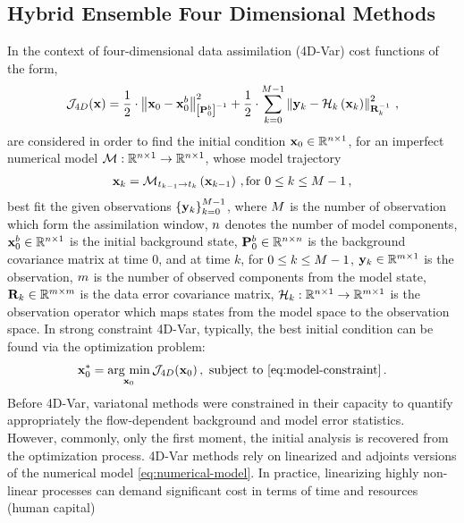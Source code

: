 \subsection{Hybrid Ensemble Four Dimensional Methods}
\label{subsec:hybrid-methods}
In the context of four-dimensional data assimilation (4D-Var) cost functions of the form,
\begin{eqnarray}
\label{eq:4D-Var-cost-function}
\displaystyle
\mathcal{J}_{4D}({\bf x}) = \frac{1}{2} \cdot \left \| {\bf x}_0-{\bf x}_0^b \right \|_{\left [ {\bf P}^b_{0} \right ]^{-1}}^2 + \frac{1}{2} \cdot \sum_{k=0}^{M-1} \left \| {\bf y}_k-\mathcal{H}_k \left ( {\bf x}_k \right ) \right \|^2_{{\bf R}_k^{-1}} \,,
\end{eqnarray}
%
are considered in order to find the initial condition ${\bf x}_0 \in \mathbb{R}^{n \times 1}$, for an imperfect numerical model $\mathcal{M}:\mathbb{R}^{n \times 1} \rightarrow \mathbb{R}^{n \times 1}$, whose model trajectory
\begin{eqnarray}
\label{eq:model-constraint}
\displaystyle
{\bf x}_{k} = \mathcal{M}_{t_{k-1} \rightarrow t_k} \left ( {\bf x}_{k-1}\right )  \,, \text{for $0 \le k \le M-1$}\,,
\end{eqnarray}
best fit the given observations $\left \{ {\bf y}_k \right \}_{k=0}^{M-1}$, where $M$ is the number of observation which form the assimilation window, $n$ denotes the number of model components, ${\bf x}_0^b \in \mathbb{R}^{n \times 1}$ is the initial background state, ${\bf P}^b_0 \in \mathbb{R}^{n \times n}$ is the background covariance matrix at time 0, and at time $k$, for $0 \le k \le M-1$, ${\bf y}_k \in \mathbb{R}^{m \times 1}$ is the observation, $m$ is the number of observed components from the model state, ${\bf R}_k \in \mathbb{R}^{m \times m}$ is the data error covariance matrix, $\mathcal{H}_k:\mathbb{R}^{n \times 1} \rightarrow \mathbb{R}^{m \times 1}$ is the observation operator which maps states from the model space to the observation space. In strong constraint 4D-Var, typically, the best initial condition can be found via the optimization problem:
\begin{eqnarray}
\label{eq:4D-constraint-optimization-problem}
\displaystyle
{\bf x}_0^{*} = \underset{{\bf x}_0}{\arg\,\min} \, \mathcal{J}_{4D}({\bf x}_0) \,,\text{ subject to \eqref{eq:model-constraint}} \,.
\end{eqnarray}
%
Before 4D-Var, variatonal methods were constrained in their capacity to quantify appropriately the flow-dependent background and model error statistics. However, commonly, only the first moment, the initial analysis is recovered from the optimization process. 4D-Var methods rely on linearized and adjoints versions of the numerical model \eqref{eq:numerical-model}. In practice, linearizing highly non-linear processes can demand significant cost in terms of time and resources (human capital) \cite{yang1996statistical,stiller2009efficient,stiller2009efficient2,ruiz2016derivative}
